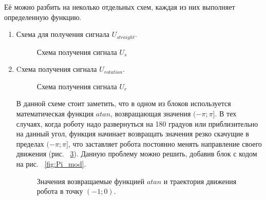 \documentclass[12pt,a4paper,openany]{extarticle}
\begin{document}
Её можно разбить на неколько отдельных схем, каждая из них выполняет определенную функцию.
\begin{enumerate}
    \item Схема для  получения сигнала $U_{straight}$.
    
 \begin{figure}[h!]

	\caption{Схема получения сигнала $U_{s}$}
	\label{fig:Us}
\end{figure}  
    
\item Cхема получения сигнала $U_{rotation}$.

\begin{figure}[h!]

	\caption{Схема получения сигнала $U_{r}$}
	\label{fig:Ur}
\end{figure} 

В данной схеме стоит заметить, что в одном из блоков используется математическая функция $atan$, возвращающая значения $(-\pi; \pi]$. В тех случаях, когда роботу надо развернуться на 180 градуов или приблизительно на данный угол, функция начинает возвращать значения резко скачущие в пределах $(-\pi; \pi]$, что заставляет робота постоянно менять направление своего движения (рис.  ~\ref{fig:Atan_coord}). Данную проблему можно решить, добавив блок с кодом на рис. ~\ref{fig:Pi_mod}.

 \begin{figure}[h!]
    \caption{Значения возвращаемые функцией $atan$ и траектория движения робота в точку $(-1;0)$.}
	\label{fig:Atan_coord}
\end{figure} 


\end{enumerate}
\end{document}
